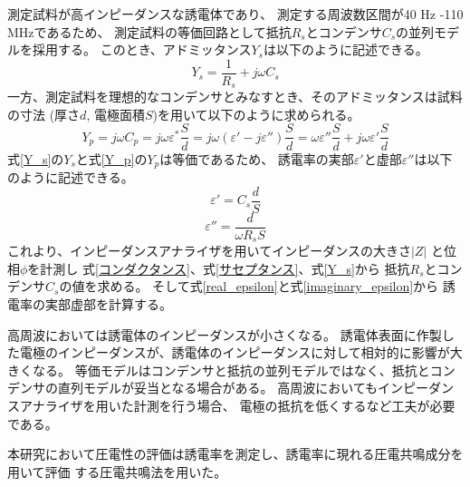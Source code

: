\documentclass[dvipdfmx,12pt,a4paper]{jreport}
\begin{document}
			測定試料が高インピーダンスな誘電体であり、
			測定する周波数区間が40 Hz -110 MHzであるため、
			測定試料の等価回路として抵抗$R_s$とコンデンサ$C_s$の並列モデルを採用する。
			このとき、アドミッタンス$Y_s$は以下のように記述できる。
			\begin{equation}
				Y_s = \frac{1}{R_s}+j\omega C_s
				\label{Y_s}
			\end{equation}
			一方、測定試料を理想的なコンデンサとみなすとき、そのアドミッタンスは試料の寸法
			(厚さ$d$, 電極面積$S$)を用いて以下のように求められる。
			\begin{equation}
				Y_p= j \omega C_p = j \omega \varepsilon^{*} \frac{S}{d} = 
				j\omega (\varepsilon'-j\varepsilon'')\frac{S}{d} =
				\omega\varepsilon''\frac{S}{d} + j\omega \varepsilon' \frac{S}{d}
				\label{Y_p}
			\end{equation}
			式\ref{Y_s}の$Y_s$と式\ref{Y_p}の$Y_p$は等価であるため、
			誘電率の実部$\varepsilon'$と虚部$\varepsilon''$は以下のように記述できる。
			\begin{equation}
				\varepsilon' = C_s \frac{d}{S}
				\label{real_epsilon}
			\end{equation}
			\begin{equation}
				\varepsilon'' = \frac{d}{\omega R_s S}
				\label{imaginary_epsilon}
			\end{equation}
			これより、インピーダンスアナライザを用いてインピーダンスの大きさ$|Z|$
			と位相$\phi$を計測し
			式\ref{コンダクタンス}、式\ref{サセプタンス}、式\ref{Y_s}から
			抵抗$R_s$とコンデンサ$C_s$の値を求める。
			そして式\ref{real_epsilon}と式\ref{imaginary_epsilon}から
			誘電率の実部虚部を計算する。
			
			高周波においては誘電体のインピーダンスが小さくなる。
			誘電体表面に作製した電極のインピーダンスが、誘電体のインピーダンスに対して相対的に影響が大きくなる。
			等価モデルはコンデンサと抵抗の並列モデルではなく、抵抗とコンデンサの直列モデルが妥当となる場合がある。
			高周波においてもインピーダンスアナライザを用いた計測を行う場合、
			電極の抵抗を低くするなど工夫が必要である。
			
			本研究において圧電性の評価は誘電率を測定し、誘電率に現れる圧電共鳴成分を用いて評価
			する圧電共鳴法を用いた。
			\newpage
\end{document}
